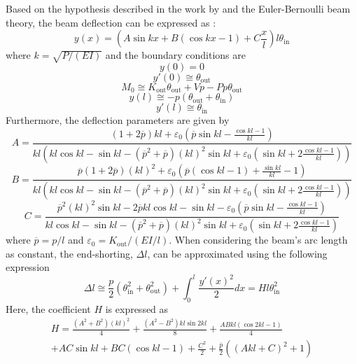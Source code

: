 Based on the hypothesis described in the work by \cite{tivot2021} and the Euler-Bernoulli beam theory, the beam deflection can be expressed as :
\begin{equation}\label{eq:deflection}
  y(x) = \left(A\sin{kx}+B(\cos{kx}-1)+C\frac{x}{l}\right) l {\theta }_\textrm{in}
\end{equation}
where $k=\sqrt{P/(EI)}$ and the boundary conditions are
\[y(0)=0\]
\[y'(0)\cong{\theta }_\textrm{out}\]
\[M_0\cong K_\textrm{out}\theta_\textrm{out}+Vp-Pp\theta_\textrm{out}\]
\[y(l)\cong -p(\theta_\textrm{out}+\theta_\textrm{in})\]
\[y'(l)\cong \theta_\textrm{in}\]
Furthermore, the deflection parameters are given by
\begin{equation}\label{A_norm}
A =    \frac{(1+2\overline{p})kl+{\varepsilon }_0\left(\overline{p}  \sin{kl}-\frac{\cos{kl}-1}{kl}\right)}
{kl\left( kl \cos{kl}-\sin{kl}-\left({\overline{p}}^2+\overline{p}\right){(kl)}^2\sin{kl}+{\varepsilon }_0\left(\sin{kl}+2\frac{\cos{kl}-1}{kl}\right)\right)}
\end{equation}
\begin{equation} \label{B_norm}
B = \frac{  \overline{p}(1+2\overline{p}){(kl)}^2+{\varepsilon }_0 \left(\overline{p} \left(\cos{kl}-1\right) + \frac{\sin{kl}}{kl} -1\right)}
{kl\left( kl \cos{kl}-\sin{kl}-\left({\overline{p}}^2+\overline{p}\right){(kl)}^2\sin{kl}+{\varepsilon }_0\left(\sin{kl}+2\frac{\cos{kl}-1}{kl}\right)\right)}
\end{equation}
\begin{equation} \label{C_norm}
C = \frac{  {\overline{p}}^2{(kl)}^2\sin{kl} -2\overline{p} kl\cos{kl} -\sin{kl} - {\varepsilon }_0\left(\overline{p}\sin{kl}-\frac{\cos{kl}-1}{kl}\right)}
{ kl \cos{kl}-\sin{kl}-\left({\overline{p}}^2+\overline{p}\right){(kl)}^2\sin{kl}+{\varepsilon }_0\left(\sin{kl}+2\frac{\cos{kl}-1}{kl}\right)}
\end{equation}
where $\overline{p} = p/l $ and $\varepsilon_0=K_\textrm{out}/(EI/l)$. When considering the beam’s arc length as constant, the end-shorting, $\Delta l$, can be approximated using the following expression
\begin{equation}\label{eq:delta_l}
 \Delta l\cong \frac{p}{2}({\theta }^2_\textrm{in}+\theta ^2_\textrm{out})+\int^l_0{\frac{y'(x)^2}{2}dx}=H l{\theta }^2_\textrm{in}
\end{equation}
Here, the coefficient $H$ is expressed as
\begin{multline}\label{eq:H-smabb}
 H = \frac{\left({A}^2+{B}^2\right){\left(kl\right)}^2}{4} + \frac{\left({A}^2-{B}^2\right)kl\sin{2kl} }{8} + \frac{AB kl\left(\cos{2kl}-1\right)}{4}\\
 +AC\sin{kl} + BC\left(\cos{kl}-1\right) + \frac{{C}^2}{2} +\frac{\overline{p}}{2}\left({\left( Akl+C\right)}^2+1\right)
\end{multline}


